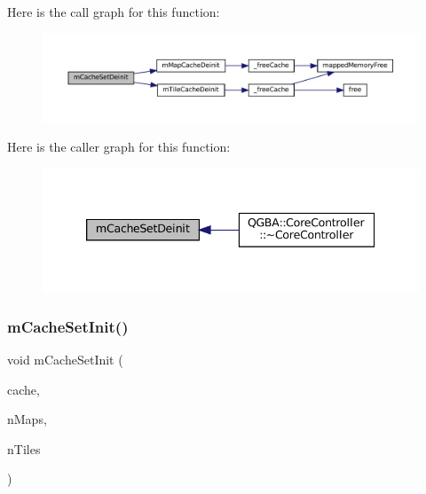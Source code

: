 Here is the call graph for this function\+:
\nopagebreak
\begin{figure}[H]
\begin{center}
\leavevmode
\includegraphics[width=350pt]{core_2cache-set_8c_ae4f1af2ec62092b9a029f684d6df8630_cgraph}
\end{center}
\end{figure}
Here is the caller graph for this function\+:
\nopagebreak
\begin{figure}[H]
\begin{center}
\leavevmode
\includegraphics[width=339pt]{core_2cache-set_8c_ae4f1af2ec62092b9a029f684d6df8630_icgraph}
\end{center}
\end{figure}
\mbox{\label{core_2cache-set_8c_a0082eccdfc7d350d0fb3092820f4bf95}} 
\subsubsection{\texorpdfstring{m\+Cache\+Set\+Init()}{mCacheSetInit()}}
{\footnotesize\ttfamily void m\+Cache\+Set\+Init (\begin{DoxyParamCaption}\item[{struct m\+Cache\+Set $\ast$}]{cache,  }\item[{size\+\_\+t}]{n\+Maps,  }\item[{size\+\_\+t}]{n\+Tiles }\end{DoxyParamCaption})}

